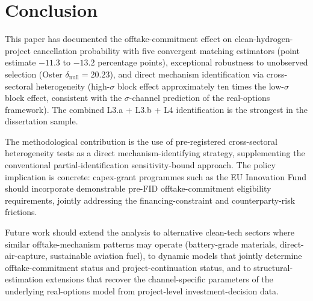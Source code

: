 \documentclass[12pt,a4paper]{article}
\theoremstyle{plain}
\theoremstyle{definition}
\begin{document}
\section{Conclusion}
\label{sec:conclusion}

This paper has documented the offtake-commitment effect on clean-hydrogen-project cancellation probability with five convergent matching estimators (point estimate $-11.3$ to $-13.2$ percentage points), exceptional robustness to unobserved selection (Oster $\delta_{\text{null}} = 20.23$), and direct mechanism identification via cross-sectoral heterogeneity (high-$\sigma$ block effect approximately ten times the low-$\sigma$ block effect, consistent with the $\sigma$-channel prediction of the real-options framework). The combined L3.a + L3.b + L4 identification is the strongest in the dissertation sample.

The methodological contribution is the use of pre-registered cross-sectoral heterogeneity tests as a direct mechanism-identifying strategy, supplementing the conventional partial-identification sensitivity-bound approach. The policy implication is concrete: capex-grant programmes such as the EU Innovation Fund should incorporate demonstrable pre-FID offtake-commitment eligibility requirements, jointly addressing the financing-constraint and counterparty-risk frictions.

Future work should extend the analysis to alternative clean-tech sectors where similar offtake-mechanism patterns may operate (battery-grade materials, direct-air-capture, sustainable aviation fuel), to dynamic models that jointly determine offtake-commitment status and project-continuation status, and to structural-estimation extensions that recover the channel-specific parameters of the underlying real-options model from project-level investment-decision data.



\end{document}
